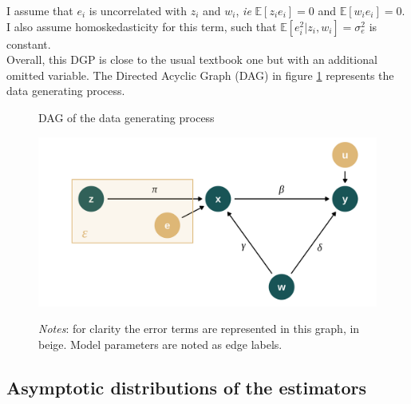 \documentclass[usletter, 12pt]{article}
\begin{document}
				I assume that $e_{i}$ is uncorrelated with $z_i$ and $w_{i}$, \textit{ie} $\mathbb{E}[z_ie_{i}] = 0$ and $\mathbb{E}[w_ie_{i}] = 0$. I also assume homoskedasticity for this term, such that $\mathbb{E}[e_{i}^{2} | z_{i}, w_{i}] = \sigma_{e}^{2}$ is constant.\\ %
				
				Overall, this DGP is close to the usual textbook one but with an additional omitted variable. The Directed Acyclic Graph (DAG) in figure \ref{DAG} represents the data generating process.
			
			 \begin{figure}[!h] 
                    			\begin{center}
                    				\caption{DAG of the data generating process}
                    				\label{DAG}
                    				\includegraphics[width=0.6\linewidth]{images/DAG_maths.png}
                                   \caption*{\footnotesize \textit{Notes}: for clarity the error terms are represented in this graph, in beige. Model parameters are noted as edge labels.}
                                    \end{center}
				\vspace{-1cm}
                    		\end{figure} 

				
		
		\subsection{Asymptotic distributions of the estimators}\label{maths_asymptotics}			 
			
\end{document}

